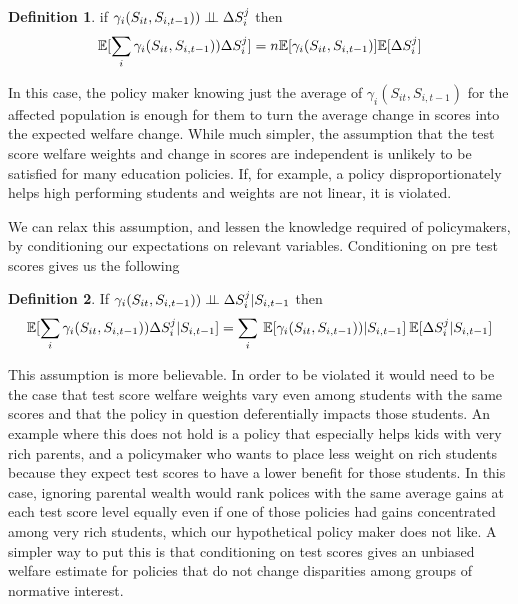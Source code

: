 \documentclass{article}
\theoremstyle{definition}
\theoremstyle{definition}
\theoremstyle{definition}
\theoremstyle{definition}
\newtheorem{definition}{Definition}
\begin{document}
    \large
    \begin{definition}
    \label{pol_indep}
    if $\gamma_i(S_{it}, S_{i,t-1})) \perp \!\!\! \perp \Delta S_i^j$ then 
    \begin{equation}
        \mathbb{E}[\sum_i \gamma_i(S_{it}, S_{i,t-1})) \Delta S_i^j]= n\mathbb{E}[\gamma_i(S_{it}, S_{i,t-1})]\mathbb{E}[\Delta S_i^j]
    \end{equation}
    \end{definition}
    
    \normalsize
    In this case, the policy maker knowing just the average of $\gamma_i(S_{it}, S_{i,t-1})$ for the affected population is enough for them to turn the average change in scores into the expected welfare change. While much simpler, the assumption that the test score welfare weights and change in scores are independent is unlikely to be satisfied for many education policies. If, for example, a policy disproportionately helps high performing students and weights are not linear, it is violated.
    
    We can relax this assumption, and lessen the knowledge required of policymakers, by conditioning our expectations on relevant variables. Conditioning on pre test scores gives us the following 
    
    \large
    \begin{definition}
    \label{cond_exp_1}
        If $ \gamma_i(S_{it}, S_{i,t-1})) \perp \!\!\! \perp \Delta S_i^j | S_{i,t-1}$ then
        \begin{equation*}
           \mathbb{E}[\sum_i \gamma_i(S_{it}, S_{i,t-1})) \Delta S_i^j| S_{i,t-1}]= \sum_i \: \mathbb{E}[\gamma_i(S_{it}, S_{i,t-1}))|S_{i,t-1}] \:\mathbb{E}[\Delta S_i^j|S_{i,t-1}] 
        \end{equation*}
    \end{definition}
    \normalsize
    
    This assumption is more believable. In order to be violated it would need to be the case that test score welfare weights vary even among students with the same scores and that the policy in question deferentially impacts those students. An example where this does not hold is a policy that especially helps kids with very rich parents, and a policymaker who wants to place less weight on rich students because they expect test scores to have a lower benefit for those students. In this case, ignoring parental wealth would rank polices with the same average gains at each test score level equally even if one of those policies had gains concentrated among very rich students, which our hypothetical policy maker does not like. A simpler way to put this is that conditioning on test scores gives an unbiased welfare estimate for policies that do not change disparities among groups of normative interest. 
    
\end{document}
